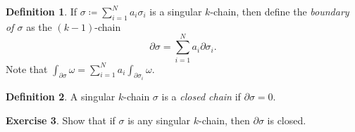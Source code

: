 \documentclass[10pt,letterpaper,cm]{nupset}
\theoremstyle{definition}
\newtheorem{definition}{Definition}[subsection]
\theoremstyle{theorem}
\newtheorem{exercise}[definition]{Exercise}
\theoremstyle{remark}
\newcommand{\1}{\mathbf{1}}
\newcommand{\0}{\vec 0}
\begin{document}
\begin{definition}
If $\sigma\coloneqq  \sum_{i=1}^Na_i\sigma_i$ is a singular $k$-chain, then define the \textit{boundary of $\sigma$} as the $(k-1)$-chain $$\partial{\sigma} = \sum_{i=1}^N a_i \partial{\sigma_i}   .$$ Note that $\int_{\partial{\sigma}}\omega = \sum_{i=1}^N a_i \int_{\partial{\sigma_i}}\omega$.
\end{definition}

\begin{definition}
A singular $k$-chain $\sigma$ is a \textit{closed chain} if $\partial{\sigma}=0$.
\end{definition}

\begin{exercise}
Show that if $\sigma$ is any singular $k$-chain, then ${\partial{\sigma}}$ is closed.
\end{exercise}
\end{document}
